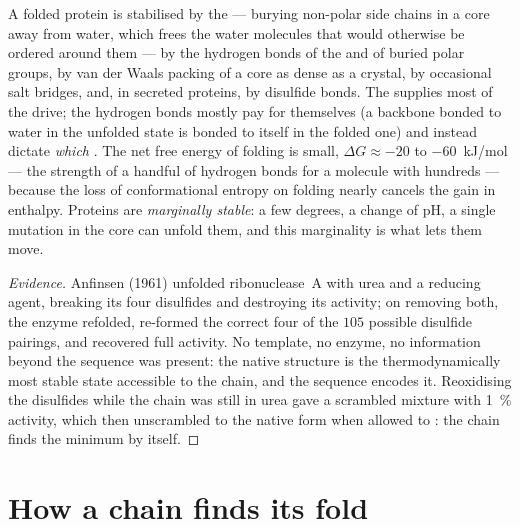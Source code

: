 \begin{proposition}\label{prop:b3:structural-biology:forces}
A folded protein is stabilised by the \emph{} ---
burying non-polar side chains in a core away from water, which frees
the water molecules that would otherwise be ordered around them --- by
the hydrogen bonds of the  and of buried polar
groups, by van der Waals packing of a core as dense as a crystal, by
occasional salt bridges, and, in secreted proteins, by disulfide
bonds. The  supplies most of the drive; the hydrogen
bonds mostly pay for themselves (a backbone bonded to water in the
unfolded state is bonded to itself in the folded one) and instead
dictate \emph{which} . The net free energy of folding is small,
$\Delta G \approx -20$ to \qty{-60}{kJ/mol} --- the strength of a
handful of hydrogen bonds for a molecule with hundreds --- because the
loss of conformational entropy on folding nearly cancels the gain in
enthalpy. Proteins are \emph{marginally stable}: a few degrees, a
change of pH, a single mutation in the core can unfold them, and this
marginality is what lets them move.
\end{proposition}

\begin{proof}[Evidence]
Anfinsen (1961) unfolded ribonuclease~A with urea and a reducing agent,
breaking its four disulfides and destroying its activity; on removing
both, the enzyme refolded, re-formed the correct four of the $105$
possible disulfide pairings, and recovered full activity. No template,
no enzyme, no information beyond the sequence was present: the native
structure is the thermodynamically most stable state accessible to the
chain, and the sequence encodes it. Reoxidising the disulfides while
the chain was still in urea gave a scrambled mixture with \qty{1}{\%}
activity, which then unscrambled to the native form when allowed to
: the chain finds the minimum by itself.
\end{proof}

\section{How a chain finds its fold}

